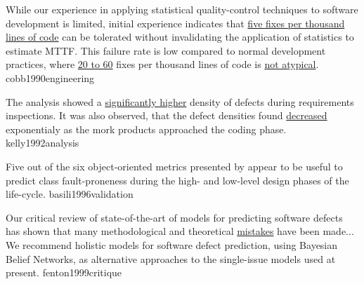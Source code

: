 \documentclass{article}
\begin{document}

  {While our experience in applying statistical quality-control techniques to software development is limited, initial experience indicates that \ul{five fixes per thousand lines of code} can be tolerated without invalidating the application of statistics to estimate MTTF. This failure rate is low compared to normal development practices, where \ul{20 to 60} fixes per thousand lines of code is \ul{not atypical}.}
  {cobb1990engineering}

  {The analysis showed a \ul{significantly higher} density of defects during requirements inspections. It was also observed, that the defect densities found \ul{decreased} exponentialy as the mork products approached the coding phase.}
  {kelly1992analysis}

  {Five out of the six object-oriented metrics presented by \citet{chidamber1994metrics} appear to be useful to predict class fault-proneness during the high- and low-level design phases of the life-cycle.}
  {basili1996validation}

  {Our critical review of state-of-the-art of models for predicting software defects has shown that many methodological and theoretical \ul{mistakes} have been made... We recommend holistic models for software defect prediction, using Bayesian Belief Networks, as alternative approaches to the single-issue models used at present.}
  {fenton1999critique}

\end{document}
